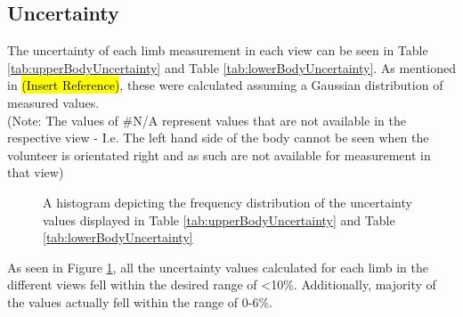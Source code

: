\subsection{Uncertainty}
The uncertainty of each limb measurement in each view can be seen in Table \ref{tab:upperBodyUncertainty} and Table \ref{tab:lowerBodyUncertainty}. As mentioned in \hl{(Insert Reference)}, these were calculated assuming a Gaussian distribution of measured values.\\ 
(Note: The values of \#N/A represent values that are not available in the respective view - I.e. The left hand side of the body cannot be seen when the volunteer is orientated right and as such are not available for measurement in that view)

\begin{figure}[ht]
	\centering
	{%
		\setlength{\fboxsep}{0pt}%
		\setlength{\fboxrule}{0.5pt}%
		}
	\caption{A histogram depicting the frequency distribution of the uncertainty values displayed in Table \ref{tab:upperBodyUncertainty} and Table \ref{tab:lowerBodyUncertainty}}
	\label{fig:uncertaintyFreqDist}
\end{figure}

As seen in Figure \ref{fig:uncertaintyFreqDist}, all the uncertainty values calculated for each limb in the different views fell within the desired range of <10\%. Additionally, majority of the values actually fell within the range of 0-6\%. 

